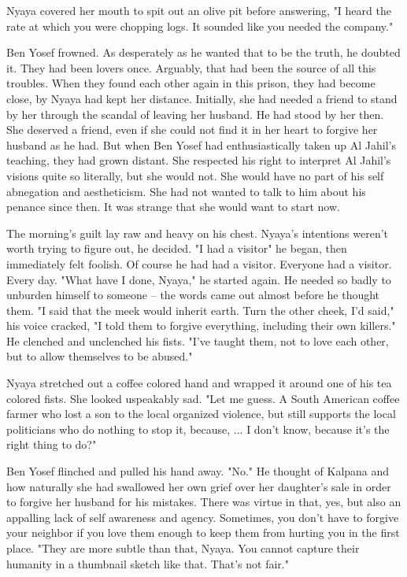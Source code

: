 \documentclass{amsart}
\begin{document}
Nyaya covered her mouth to spit out an olive pit before answering, "I heard the rate at which you were chopping logs. It sounded like you needed the company." 

Ben Yosef frowned. As desperately as he wanted that to be the truth, he doubted it. They had been lovers once. Arguably, that had been the source of all this troubles. When they found each other again in this prison, they had become close, by Nyaya had kept her distance. Initially, she had needed a friend to stand by her through the scandal of leaving her husband. He had stood by her then. She deserved a friend, even if she could not find it in her heart to forgive her husband as he had. But when Ben Yosef had enthusiastically taken up Al Jahil's teaching, they had grown distant. She respected his right to interpret Al Jahil's visions quite so literally, but she would not. She would have no part of his self abnegation and aestheticism. She had not wanted to talk to him about his penance since then. It was strange that she would want to start now.

The morning's guilt lay raw and heavy on his chest. Nyaya's intentions weren't worth trying to figure out, he decided. "I had a visitor" he began, then immediately felt foolish. Of course he had had a visitor. Everyone had a visitor. Every day. "What have I done, Nyaya," he started again. He needed so badly to unburden himself to someone -- the words came out almost before he thought them. "I said that the meek would inherit earth. Turn the other cheek, I'd said," his voice cracked, "I told them to forgive everything, including their own killers." He clenched and unclenched his fists. "I've taught them, not to love each other, but to allow themselves to be abused."

Nyaya stretched out a coffee colored hand and wrapped it around one of his tea colored fists. She looked uspeakably sad. "Let me guess. A South American coffee farmer who lost a son to the local organized violence, but still supports the local politicians who do nothing to stop it, because, ... I don't know, because it's the right thing to do?"

Ben Yosef flinched and pulled his hand away. "No." He thought of Kalpana and how naturally she had swallowed her own grief over her daughter's sale in order to forgive her husband for his mistakes. There was virtue in that, yes, but also an appalling lack of self awareness and agency. Sometimes, you don't have to forgive your neighbor if you love them enough to keep them from hurting you in the first place. "They are more subtle than that, Nyaya. You cannot capture their humanity in a thumbnail sketch like that. That's not fair." 
\end{document}
